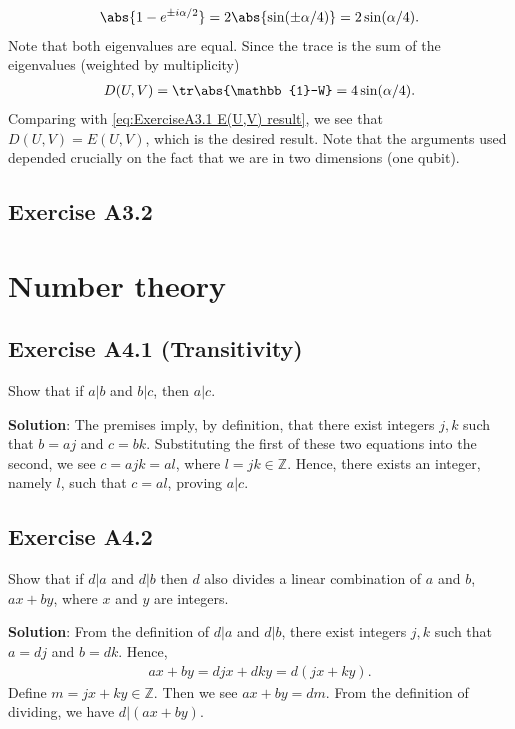 \documentclass{book}
\begin{document}
    \begin{align}
        \abs{1-e^{\pm i\alpha/2}} = 2\abs{\sin(\pm \alpha/4)} = 2 \sin (\alpha/4).
    \end{align}
    Note that both eigenvalues are equal. Since the trace is the sum of the eigenvalues (weighted by multiplicity)
    \begin{align}
        D(U,V) = \tr \abs{\mathbb{1}-W} = 4\sin(\alpha/4).
    \end{align}
    Comparing with \eqref{eq:ExerciseA3.1 E(U,V) result}, we see that $D(U,V) = E(U,V)$, which is the desired result. Note that the arguments used depended crucially on the fact that we are in two dimensions (one qubit).
    
\section*{Exercise A3.2}

\chapter{Number theory}


\section*{Exercise A4.1 (Transitivity)}
    Show that if $a|b$ and $b|c$, then $a|c$.
    
    \textbf{Solution}: The premises imply, by definition, that there exist integers $j, k$ such that $b = a j$ and $c = b k$. Substituting the first of these two equations into the second, we see $c = a j k = a l$, where $l = j k \in \mathbb{Z}$. Hence, there exists an integer, namely $l$, such that $c = a l$, proving $a |c$.

\section*{Exercise A4.2}
    Show that if $d|a$ and $d|b$ then $d$ also divides a linear combination of $a$ and $b$, $ax+by$, where $x$ and $y$ are integers.
    
    \textbf{Solution}: From the definition of $d|a$ and $d|b$, there exist integers $j, k $ such that $a = d j$ and $b= dk$. Hence,
    \begin{align}
        ax + by = djx + dky = d(jx + ky).
    \end{align}
    Define $m = jx +ky \in \mathbb{Z}$. Then we see $ax + by = dm$. From the definition of dividing, we have $d|(ax+by)$. 
\end{document}
